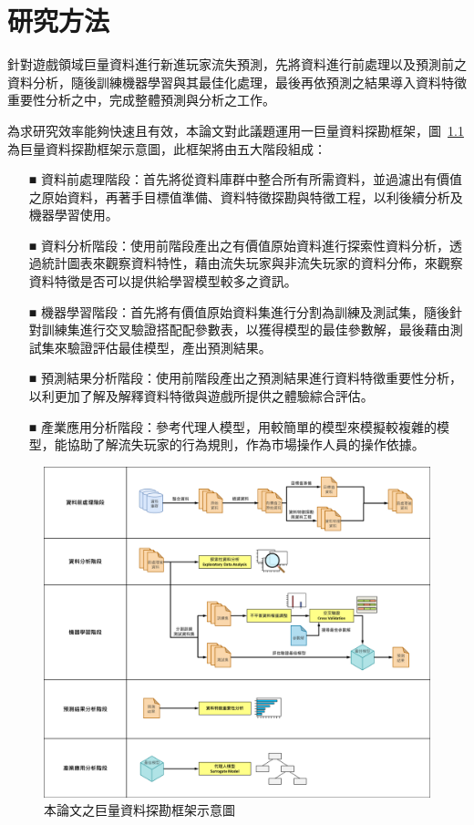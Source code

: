 \chapter{研究方法}
\label{cha:Method}

針對遊戲領域巨量資料進行新進玩家流失預測，先將資料進行前處理以及預測前之資料分析，隨後訓練機器學習與其最佳化處理，最後再依預測之結果導入資料特徵重要性分析之中，完成整體預測與分析之工作。

為求研究效率能夠快速且有效，本論文對此議題運用一巨量資料探勘框架，圖~\ref{fig:Image_Framework} 為巨量資料探勘框架示意圖，此框架將由五大階段組成：

\begin{itemize}
  \item[■] 資料前處理階段：首先將從資料庫群中整合所有所需資料，並過濾出有價值之原始資料，再著手目標值準備、資料特徵探勘與特徵工程，以利後續分析及機器學習使用。
  \item[■] 資料分析階段：使用前階段產出之有價值原始資料進行探索性資料分析，透過統計圖表來觀察資料特性，藉由流失玩家與非流失玩家的資料分佈，來觀察資料特徵是否可以提供給學習模型較多之資訊。
  \item[■] 機器學習階段：首先將有價值原始資料集進行分割為訓練及測試集，隨後針對訓練集進行交叉驗證搭配配參數表，以獲得模型的最佳參數解，最後藉由測試集來驗證評估最佳模型，產出預測結果。
  \item[■] 預測結果分析階段：使用前階段產出之預測結果進行資料特徵重要性分析，以利更加了解及解釋資料特徵與遊戲所提供之體驗綜合評估。
  \item[■] 產業應用分析階段：參考代理人模型，用較簡單的模型來模擬較複雜的模型，能協助了解流失玩家的行為規則，作為市場操作人員的操作依據。
\end{itemize} 

\begin{figure}[!htb]
  \begin{center}
    \includegraphics[width=1\textwidth]{figures/Image_Framework.png}
    \caption[本論文之巨量資料探勘框架示意圖]{本論文之巨量資料探勘框架示意圖}
    \label{fig:Image_Framework}
  \end{center}
\end{figure}
\newpage


